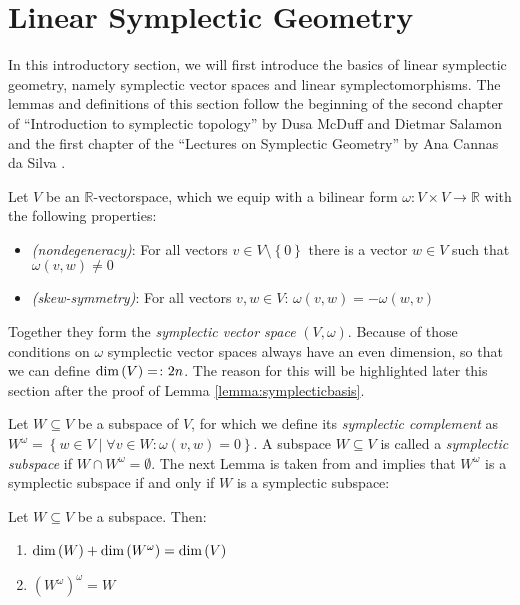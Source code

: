 \documentclass[../SymplecticSimplices.tex]{subfiles}
\begin{document}
\section{Linear Symplectic Geometry}

In this introductory section, we will first introduce the basics of linear symplectic geometry, namely symplectic vector spaces and linear symplectomorphisms. The lemmas and definitions of this section follow the beginning of the second chapter of “Introduction to symplectic topology” by Dusa McDuff and Dietmar Salamon \cite{mcduff} and the first chapter of the “Lectures on Symplectic Geometry” by Ana Cannas da Silva \cite{dasilva}.

Let \( V \) be an \( \mathbb{R} \)-vectorspace, which we equip with a bilinear form \( \omega \colon V \times V \rightarrow \mathbb{R} \) with the following properties:

\begin{itemize}
  \item[] \textit{(nondegeneracy)}: For all vectors \( v \in V \setminus \left\lbrace 0 \right\rbrace \) there is a vector \( w \in V \) such that \( \omega \left( v, w \right) \neq 0 \)
  \item[] \textit{(skew-symmetry)}: For all vectors \( v, w \in V \): \( \omega \left( v, w \right) = - \omega \left( w, v \right) \)
\end{itemize}

Together they form the \textit{symplectic vector space} \( \left( V, \omega \right) \). Because of those conditions on \( \omega \) symplectic vector spaces always have an even dimension, so that we can define \( \textnormal{dim} \left( V \right) = \colon 2n \). The reason for this will be highlighted later this section after the proof of Lemma \ref{lemma:symplecticbasis}.

Let \( W \subseteq V \) be a subspace of \( V \), for which we define its \textit{symplectic complement} as \( W^\omega = \left\lbrace w \in V \mid \forall v \in W \colon \omega\left( v, w \right) = 0 \right\rbrace \). A subspace \( W \subseteq V \) is called a \textit{symplectic subspace} if \( W \cap W^{\omega} = \emptyset \). The next Lemma is taken from \cite[Lemma 2.2]{mcduff} and implies that \( W^\omega \) is a symplectic subspace if and only if \( W \) is a symplectic subspace:

\begin{lemma}
  \label{lemma:symplecticcomplementofsymplecticcomplement}
  Let \( W \subseteq V \) be a subspace. Then:
  \begin{enumerate}
    \item \( \textnormal{dim} \left( W \right) + \textnormal{dim} \left( W^\omega \right) = \textnormal{dim} \left( V \right) \)
    \item \( \left( W^\omega \right)^\omega = W \)
  \end{enumerate}
\end{lemma}
\end{document}
